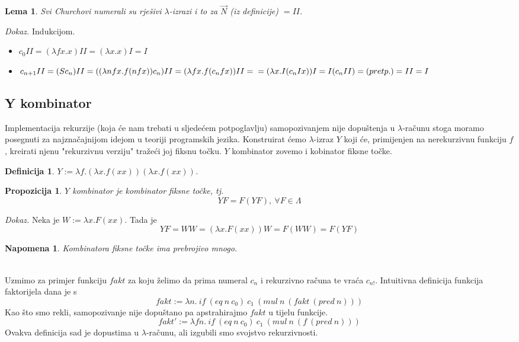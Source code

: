 \documentclass[a4paper,12pt]{article}
\newtheorem{lem}[thm]{Lema}
\newtheorem{defn}[thm]{Definicija}
\newtheorem{rem}[thm]{Napomena}
\newtheorem{prop}[thm]{Propozicija}
\newenvironment{proof}{\textit{Dokaz.}}{\hfill}
\begin{document}
\begin{lem} Svi Churchovi numerali su rješivi $\lambda$-izrazi i to za $\overrightarrow{N}$ (iz definicije) $= I I$.
\end{lem}
\begin{proof} Indukcijom.
\begin{itemize}
	\item $c_0 I I = (\lambda f x. x) I I = (\lambda x. x) I = I$
	\item $c_{n+1} I I = (S c_n) I I = ((\lambda n f x. f (n f x)) c_n) I I = (\lambda f x. f (c_n f x)) I I =\\= (\lambda x. I (c_n I x)) I = I (c_n I I) = (pretp.) = I I = I$
\end{itemize}
\end{proof}

\subsection{Y kombinator}

Implementacija rekurzije (koja će nam trebati u sljedećem potpoglavlju) samopozivanjem nije dopuštenja u $\lambda$-računu stoga moramo posegnuti za najznačajnijom idejom u teoriji programskih jezika. Konstruirat ćemo $\lambda$-izraz $Y$ koji će, primijenjen na nerekurzivnu funkciju $f$, kreirati njenu "rekurzivnu verziju" tražeći joj fiksnu točku. $Y$ kombinator zovemo i kobinator fiksne točke.

\begin{defn} $Y := \lambda f.(\lambda x.f(x x))(\lambda x.f(x x))$.
\end{defn}

\begin{prop} $Y$ kombinator je kombinator fiksne točke, tj. 
	\[ YF = F(YF),\ \forall F \in \Lambda \]
\end{prop}
\begin{proof} Neka je $W := \lambda x. F (x x)$. Tada je
	\[ YF = WW = (\lambda x. F (x x)) W = F(WW) = F(YF) \]
\end{proof}
\begin{rem} Kombinatora fiksne točke ima prebrojivo mnogo. 
\end{rem}
~\\
Uzmimo za primjer funkciju $fakt$ za koju želimo da prima numeral $c_n$ i rekurzivno računa te vraća $c_{n!}$. Intuitivna definicija funkcija faktorijela dana je s
	\[ fakt := \lambda n.\ if\ (eq\ n\ c_0)\ c_1\ (mul\ n\ (fakt\ (pred\ n))) \]
Kao što smo rekli, samopozivanje nije dopuštano pa apstrahirajmo $fakt$ u tijelu funkcije.
	\[ fakt' := \lambda f n.\ if\ (eq\ n\ c_0)\ c_1\ (mul\ n\ (f\ (pred\ n))) \]
Ovakva definicija sad je dopustima u $\lambda$-računu, ali izgubili smo svojstvo rekurzivnosti.
\end{document}
